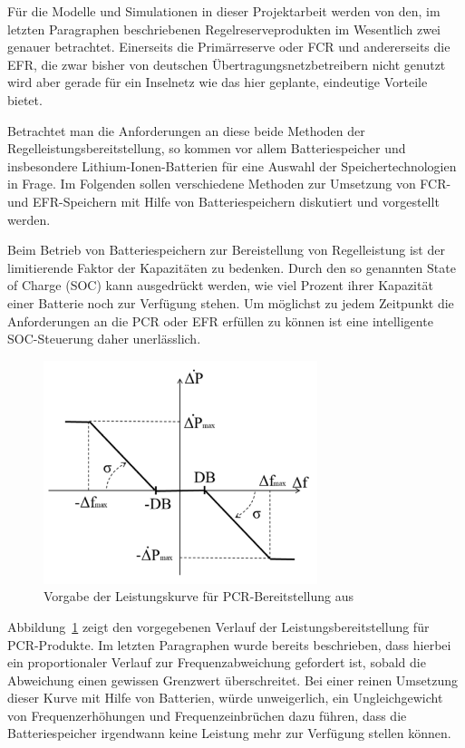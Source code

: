 Für die Modelle und Simulationen in dieser Projektarbeit werden von den, im letzten Paragraphen beschriebenen Regelreserveprodukten
im Wesentlich zwei genauer betrachtet.
Einerseits die Primärreserve oder FCR und andererseits die EFR, die zwar bisher von deutschen Übertragungsnetzbetreibern nicht genutzt wird
aber gerade für ein Inselnetz wie das hier geplante, eindeutige Vorteile bietet.

Betrachtet man die Anforderungen an diese beide Methoden der Regelleistungsbereitstellung, so kommen vor allem
Batteriespeicher und insbesondere Lithium-Ionen-Batterien für eine Auswahl der Speichertechnologien in Frage.
Im Folgenden sollen verschiedene Methoden zur Umsetzung von FCR- und EFR-Speichern mit Hilfe von Batteriespeichern 
diskutiert und vorgestellt werden.

Beim Betrieb von Batteriespeichern zur Bereistellung von Regelleistung ist der limitierende Faktor der Kapazitäten zu bedenken.
Durch den so genannten State of Charge (SOC) kann ausgedrückt werden, wie viel Prozent ihrer Kapazität einer Batterie noch zur Verfügung stehen.
Um möglichst zu jedem Zeitpunkt die Anforderungen an die PCR oder EFR erfüllen zu können ist eine intelligente
SOC-Steuerung daher unerlässlich.

\begin{figure}[h!]
    \centering
    \includegraphics[width=8cm]{Abbildungen/DroopControl.png}
    \caption{Vorgabe der Leistungskurve für PCR-Bereitstellung aus~\parencite[Kap. 3]{noauthor_soc_nodate}}\label{Droop}
\end{figure}

Abbildung~\ref{Droop} zeigt den vorgegebenen Verlauf der Leistungsbereitstellung für PCR-Produkte.
Im letzten Paragraphen wurde bereits beschrieben, dass hierbei ein proportionaler Verlauf zur Frequenzabweichung 
gefordert ist, sobald die Abweichung einen gewissen Grenzwert überschreitet.
Bei einer reinen Umsetzung dieser Kurve mit Hilfe von Batterien, würde unweigerlich, ein Ungleichgewicht von 
Frequenzerhöhungen und Frequenzeinbrüchen dazu führen, dass die Batteriespeicher irgendwann keine Leistung mehr
zur Verfügung stellen können.

